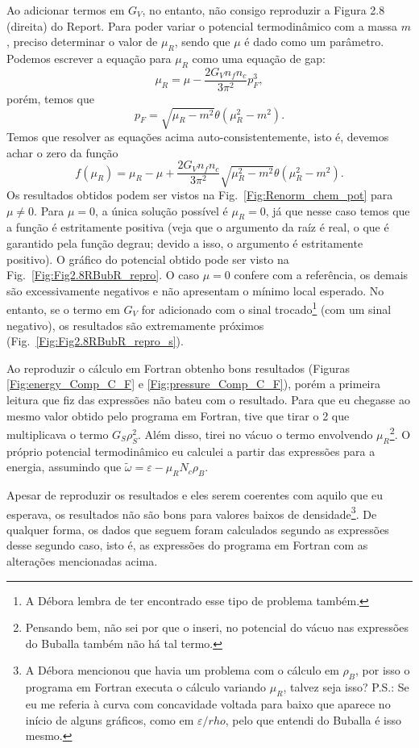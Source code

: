 Ao adicionar termos em $G_V$, no entanto, não consigo reproduzir a Figura 2.8 (direita) do Report. Para poder variar o potencial termodinâmico com a massa $m$, preciso determinar o valor de $\mu_R$, sendo que $\mu$ é dado como um parâmetro. Podemos escrever a equação para $\mu_R$ como uma equação de gap:
\begin{equation}\label{Eq:Renorm_chem_pot_auto_1}
	\mu_R = \mu - \frac{2G_V n_fn_c}{3\pi^2}p_F^3,
\end{equation}
%
porém, temos que
\begin{equation}\label{Eq:Renorm_chem_pot_auto_2}
	p_F = \sqrt{\mu_R - m^2} \theta(\mu_R^2 - m^2).
\end{equation}
%
Temos que resolver as equações acima auto-consistentemente, isto é, devemos achar o zero da função
\begin{equation}
	f(\mu_R) = \mu_R - \mu + \frac{2G_V n_fn_c}{3\pi^2} \sqrt{\mu_R^2 - m^2}\theta(\mu_R^2 - m^2).
\end{equation}
%
Os resultados obtidos podem ser vistos na Fig.~\ref{Fig:Renorm_chem_pot} para $\mu \neq 0$. Para $\mu = 0$, a única solução possível é $\mu_R = 0$, já que nesse caso temos que a função é estritamente positiva (veja que o argumento da raíz é real, o que é garantido pela função degrau; devido a isso, o argumento é estritamente positivo). O gráfico do potencial obtido pode ser visto na Fig.~\ref{Fig:Fig2.8RBubR_repro}. O caso $\mu = 0$ confere com a referência, os demais são excessivamente negativos e não apresentam o mínimo local esperado. No entanto, se o termo em $G_V$ for adicionado com o sinal trocado\footnote{A Débora lembra de ter encontrado esse tipo de problema também.} (com um sinal negativo), os resultados são extremamente próximos (Fig.~\ref{Fig:Fig2.8RBubR_repro_s}).

Ao reproduzir o cálculo em Fortran obtenho bons resultados (Figuras \ref{Fig:energy_Comp_C_F} e \ref{Fig:pressure_Comp_C_F}), porém a primeira leitura que fiz das expressões não bateu com o resultado. Para que eu chegasse ao mesmo valor obtido pelo programa em Fortran, tive que tirar o 2 que multiplicava o termo $G_S \rho_S^2$. Além disso, tirei no vácuo o termo envolvendo $\mu_R$\footnote{Pensando bem, não sei por que o inseri, no potencial do vácuo nas expressões do Buballa também não há tal termo.}. O próprio potencial termodinâmico eu calculei a partir das expressões para a energia, assumindo que $\tilde{\omega} = \varepsilon - \mu_R N_c \rho_B$.
	
Apesar de reproduzir os resultados e eles serem coerentes com aquilo que eu esperava, os resultados não são bons para valores baixos de densidade\footnote{A Débora mencionou que havia um problema com o cálculo em $\rho_B$, por isso o programa em Fortran executa o cálculo variando $\mu_R$, talvez seja isso? P.S.: Se eu me referia à curva com concavidade voltada para baixo que aparece no início de alguns gráficos, como em $\varepsilon/rho$, pelo que entendi do Buballa é isso mesmo.}. De qualquer forma, os dados que seguem foram calculados segundo as expressões desse segundo caso, isto é, as expressões do programa em Fortran com as alterações mencionadas acima. 

